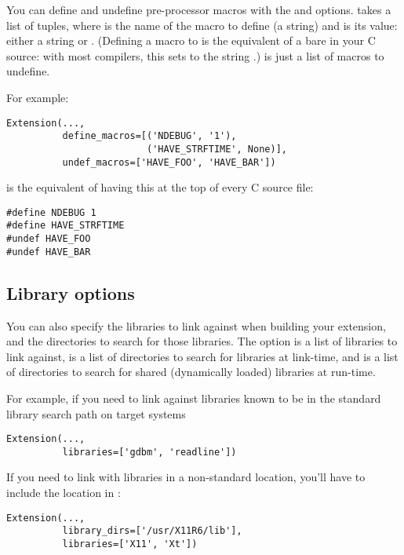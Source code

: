 \documentclass{manual}
\begin{document}
You can define and undefine pre-processor macros with the
 and  options.
 takes a list of  tuples, where
 is the name of the macro to define (a string) and
 is its value: either a string or .  (Defining a
macro  to  is the equivalent of a bare
 in your C source: with most compilers, this sets
 to the string .)   is just
a list of macros to undefine.

For example:

\begin{verbatim}
Extension(...,
          define_macros=[('NDEBUG', '1'),
                         ('HAVE_STRFTIME', None)],
          undef_macros=['HAVE_FOO', 'HAVE_BAR'])
\end{verbatim}

is the equivalent of having this at the top of every C source file:

\begin{verbatim}
#define NDEBUG 1
#define HAVE_STRFTIME
#undef HAVE_FOO
#undef HAVE_BAR
\end{verbatim}


\subsection{Library options}

You can also specify the libraries to link against when building your
extension, and the directories to search for those libraries.  The
 option is a list of libraries to link against,
 is a list of directories to search for libraries at 
link-time, and  is a list of directories to 
search for shared (dynamically loaded) libraries at run-time.

For example, if you need to link against libraries known to be in the
standard library search path on target systems

\begin{verbatim}
Extension(...,
          libraries=['gdbm', 'readline'])
\end{verbatim}

If you need to link with libraries in a non-standard location, you'll
have to include the location in :

\begin{verbatim}
Extension(...,
          library_dirs=['/usr/X11R6/lib'],
          libraries=['X11', 'Xt'])
\end{verbatim}
\end{document}

